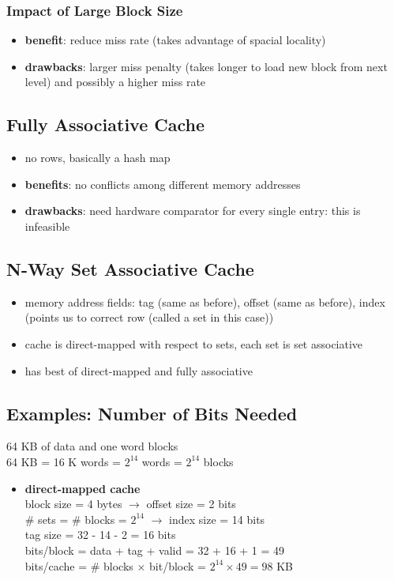 \documentclass{../cheatsheet}
\begin{document}
\begin{multicols*}{2}
    \subsubsection{Impact of Large Block Size}
    \begin{itemize}
        \item \textbf{benefit}: reduce miss rate (takes advantage of spacial
            locality)
        \item \textbf{drawbacks}: larger miss penalty (takes longer to load new
            block from next level) and possibly a higher miss rate
    \end{itemize}

    \subsection{Fully Associative Cache}
    \begin{itemize}
        \item no rows, basically a hash map
        \item \textbf{benefits}: no conflicts among different memory addresses
        \item \textbf{drawbacks}: need hardware comparator for every single
            entry: this is infeasible
    \end{itemize}

    \subsection{N-Way Set Associative Cache}
    \begin{itemize}
        \item memory address fields: tag (same as before), offset (same as
            before), index (points us to correct row (called a set in this
            case))
        \item cache is direct-mapped with respect to sets, each set is set
            associative
        \item has best of direct-mapped and fully associative
    \end{itemize}

    \subsection{Examples: Number of Bits Needed}
    64 KB of data and one word blocks\\
    64 KB = 16 K words = $2^{14}$ words = $2^{14}$ blocks
    \begin{itemize}
        \item \textbf{direct-mapped cache}\\
            block size = 4 bytes $\rightarrow$ offset size = 2 bits\\
            \# sets = \# blocks = $2^{14}$ $\rightarrow$ index size = 14 bits\\
            tag size = 32 - 14 - 2 = 16 bits\\
            bits/block = data + tag + valid = 32 + 16 + 1 = 49\\
            bits/cache = \# blocks $\times$ bit/block = $2^{14} \times 49 = 98$
            KB


\end{itemize}
\end{multicols*}
\end{document}
